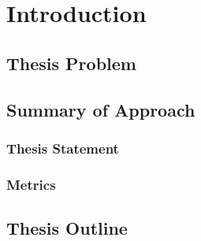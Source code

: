\chapter{Introduction}

\section{Thesis Problem}

\section{Summary of Approach}

\subsection{Thesis Statement}

\subsection{Metrics}

\section{Thesis Outline}
